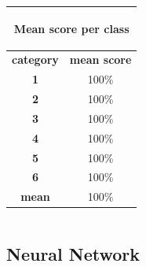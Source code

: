 \documentclass[c]{beamer}
\begin{document}
\begin{frame}
\begin{columns}
\begin{column}{0.5\textwidth}
\begin{overlayarea}{\linewidth}{2cm}
\begin{table}
\begin{center}
\begin{adjustbox}{max width=0.4\textwidth}
{\begin{tabular}{|c|c|}
      \multicolumn{2}{|c|}{\begin{bf}Mean score per class\end{bf}} \\
      \hline
      \textbf{category} & \textbf{mean score}\\
      \hline
      \textbf{1} & 100\% \\
      \hline
      \textbf{2} & 100\% \\
      \hline
      \textbf{3} & 100\% \\
      \hline
      \textbf{4} & 100\% \\
      \hline
      \textbf{5} & 100\% \\
      \hline
      \textbf{6} & 100\% \\
      \hline
      \textbf{mean} & 100\% \\
      \hline
    \end{tabular}
    }
    \end{adjustbox}
    \end{center}
  \end{table}
  \end{overlayarea}
\end{column}
\end{columns}
\end{frame}

\subsection{Neural Network}
\end{document}
